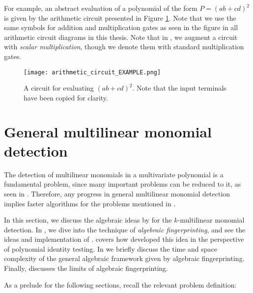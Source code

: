 For example, an abstract evaluation of a polynomial
 of the form 
$P = (ab+cd)^2$ is given by the arithmetic circuit presented in Figure \ref{fig:circuit_example}. 
Note that we use the same symbols for addition and multiplication gates as seen in the figure 
in all arithmetic circuit diagrams in this thesis. 
Note that in , we augment a circuit with \emph{scalar multiplication}, 
though we denote them with standard multiplication gates.

\begin{figure}[h]
  \texttt{[image: arithmetic\_circuit\_EXAMPLE.png]}
  \centering
  \caption{A circuit for evaluating $(ab+cd)^2$. 
  Note that the input terminals have been copied for clarity.}
  \label{fig:circuit_example}
\end{figure}

\section{General multilinear monomial detection}
\label{sect:general_mld}

The detection of multilinear monomials in a multivariate polynomial is a fundamental problem, 
since many important problems can be reduced to it, 
as seen in . 
Therefore, any progress in general multilinear monomial detection implies 
faster algorithms for the problems mentioned in .

In this section, 
we discuss the algebraic ideas by \citeauthor{KouWil09} \cite{Koutis08, Williams09, KouWil09} 
for the $k$-multilinear monomial detection. 
In , 
we dive into the technique of \emph{algebraic fingerprinting}, and 
see the ideas and implementation of \textcite{Koutis08}. 
 covers how 
\textcite{Williams09} developed this idea  
in the perspective of polynomial identity testing. 
In  we briefly discuss the time and space complexity 
of the general algebraic framework given by algebraic fingerprinting. 
Finally,  discusses the limits of algebraic fingerprinting.

As a prelude for the following sections, recall the relevant problem definition: 
\begin{problem}
\end{problem}

